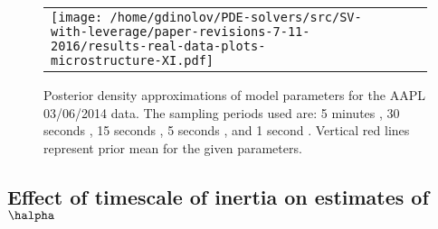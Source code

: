 \begin{figure}[h!]
\begin{tabular}{m{0.25cm}ccc}
\begin{minipage}{0.20\textwidth}
				\centering
				\texttt{[image: /home/gdinolov/PDE-solvers/src/SV-with-leverage/paper-revisions-7-11-2016/results-real-data-plots-microstructure-XI.pdf]}
				\end{minipage}
	\end{tabular}
	\caption{Posterior density approximations of model parameters
          for the AAPL 03/06/2014 data. The sampling periods used are:
          5 minutes \usebox{\legendLineOne}, 30 seconds
          \usebox{\legendLineTwo}, 15 seconds
          \usebox{\legendLineThree}, 5 seconds
          \usebox{\legendLineFour}, and 1 second
          \usebox{\legendLineFive}. Vertical red lines represent prior
          mean for the given parameters.}
	\label{fig:posterior-parameters-real}
\end{figure}

\subsection{Effect of timescale of inertia on estimates of $\halpha$}\label{se:effect-timescale}

